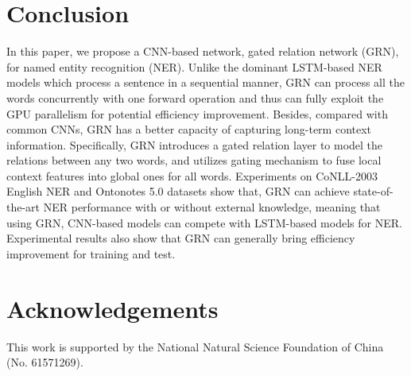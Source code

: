 \documentclass[letterpaper]{article} \usepackage{aaai19}  \usepackage{times}  \usepackage{helvet}  \usepackage{courier}  \usepackage{url}  \usepackage{graphicx}  \usepackage{amsmath}
\newcommand{\ie}{\text{i.e.,}}
\newcommand{\GRN}{GRN}
\begin{document}
\section{Conclusion}
In this paper, we propose a CNN-based network, \ie{} gated relation network (\GRN{}), for named entity recognition (NER). Unlike the dominant LSTM-based NER models which process a sentence in a sequential manner, \GRN{} can process all the words concurrently with one forward operation and thus can fully exploit the GPU parallelism for potential efficiency improvement. Besides, compared with common CNNs, \GRN{} has a better capacity of capturing long-term context information. Specifically, \GRN{} introduces a gated relation layer to model the relations between any two words, and utilizes gating mechanism to fuse local context features into global ones for all words. Experiments on CoNLL-2003 English NER and Ontonotes 5.0 datasets show that, \GRN{} can achieve state-of-the-art NER performance with or without external knowledge, meaning that using \GRN{}, CNN-based models can compete with LSTM-based models for NER. Experimental results also show that \GRN{} can generally bring efficiency improvement for training and test.

\section{Acknowledgements}
This work is supported by the National Natural Science Foundation of China (No. 61571269).



\end{document}
